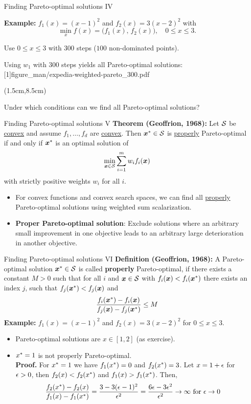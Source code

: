 \documentclass[11pt,compress,t,notes=noshow,xcolor=table]{beamer}
\begin{document}
\begin{framei}[align=top, sep=0.5em]{Finding Pareto-optimal solutions IV}
\item \textbf{Example:} $f_1(x) = (x-1)^2$ and $f_2(x) = 3(x-2)^2$ with
$$
\min_{x} f(x)
= \bigl(f_1(x),\, f_2(x)\bigr),
\quad 0 \le x \le 3.
$$
\item Use $0 \le x \le 3$ with $300$ steps ($100$ non-dominated points).
\item Using $w_1$ with $300$ steps yields all Pareto-optimal solutions:
\imageFixed{1cm}{4cm}[1]{figure_man/expedia-weighted-pareto_300.pdf}
\begin{textblock*}{\linewidth}(1.5cm,8.5cm)
\item Under which conditions can we find all Pareto-optimal solutions?
\end{textblock*}
\end{framei}


\begin{framev}{Finding Pareto-optimal solutions V}
\textbf{Theorem (Geoffrion, 1968):} Let $\S$ be \underline{convex} and assume $f_1,\dots,f_d$ are \underline{convex}. Then $\xvs \in \S$ is \underline{properly} Pareto-optimal if and only if
$\xvs$ is an optimal solution of
$$\min_{\xv \in \S } \sumim w_i f_i(\xv)$$
with strictly positive weights $w_i$ for all $i$.
\spacer
\begin{itemize}
\item For convex functions and convex search spaces, we can find all \underline{properly} Pareto-optimal solutions using weighted sum scalarization.
\item \textbf{Proper Pareto-optimal solution}: Exclude solutions where an arbitrary small improvement in one objective leads to an arbitrary large deterioration in another objective.
\end{itemize}
\end{framev}


\begin{framev}{Finding Pareto-optimal solutions VI}
\textbf{Definition (Geoffrion, 1968):} A Pareto-optimal solution $\xvs \in \S$ is called \textbf{properly} Pareto-optimal, if there exists a constant $M>0$ such that for all $i$ and ${\xv} \in \S$ with $f_i(\xv) < f_i(\xvs)$ there exists an index $j$, such that $f_j(\xvs) < f_j(\xv)$ and
$$ \frac{f_i(\xvs)-f_i(\xv)}{f_j(\xv)-f_j(\xvs)} \leq M$$
\textbf{Example:} $f_1(x) =(x-1)^2$ and $f_2(x) = 3(x-2)^2$ for $0 \le x \le 3$.
\begin{itemize}
\item Pareto-optimal solutions are $x \in [1,2]$ (as exercise).
\item $\xs=1$ is not properly Pareto-optimal.\\
\textbf{Proof.} For $\xs=1$ we have $f_1(\xs)=0$ and $f_2(\xs)=3$. Let $x=1+\eps$ for $\eps>0$, then $f_2(x)<f_2(\xs)$ and $f_1(x)>f_1(\xs)$. Then,
$$\frac{f_2(\xs)-f_2(x)}{f_1(x)-f_1(\xs)} = \frac{3- 3(\eps-1)^2}{\eps^2} =\frac{6\eps-3\eps^2}{\eps^2}\to \infty \text{ for } \eps \to 0$$
\end{itemize}
\end{framev}
\end{document}
